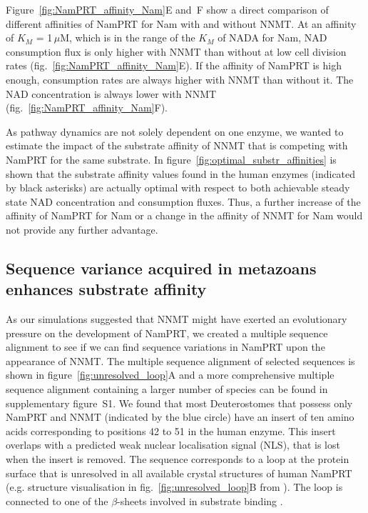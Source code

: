 Figure~\ref{fig:NamPRT_affinity_Nam}E and~F show a direct comparison of different affinities of NamPRT for Nam with and without NNMT. At an affinity of $K_{M}$ = 1\,$\mu$M, which is in the range of the $K_{M}$ of NADA for Nam, NAD consumption flux is only higher with NNMT than without at low cell division rates (fig.~\ref{fig:NamPRT_affinity_Nam}E). If the affinity of NamPRT is high enough, consumption rates are always higher with NNMT than without it. The NAD concentration is always lower with NNMT (fig.~\ref{fig:NamPRT_affinity_Nam}F).

As pathway dynamics are not solely dependent on one enzyme, we wanted to estimate the impact of the substrate affinity of NNMT that is competing with NamPRT for the same substrate. In figure~\ref{fig:optimal_substr_affinities} is shown that the substrate affinity values found in the human enzymes (indicated by black asterisks) are actually optimal with respect to both achievable steady state NAD concentration and consumption fluxes. Thus, a further increase of the affinity of NamPRT for Nam or a change in the affinity of NNMT for Nam would not provide any further  advantage.


\subsection{Sequence variance acquired in metazoans enhances substrate affinity}

As our simulations suggested that NNMT might have exerted an evolutionary pressure on the development of NamPRT, we created a multiple sequence alignment to see if we can find sequence variations in NamPRT upon the appearance of NNMT. The multiple sequence alignment of selected sequences is shown in figure~\ref{fig:unresolved_loop}A and a more comprehensive multiple sequence alignment containing a larger number of species can be found in supplementary figure~S1. We found that most Deuterostomes that possess only NamPRT and NNMT (indicated by the blue circle) have an insert of ten amino acids corresponding to positions 42 to 51 in the human enzyme. This insert overlaps with a predicted weak nuclear localisation signal (NLS), that is lost when the insert is removed. The sequence corresponds to a loop at the protein surface that is unresolved in all available crystal structures of human NamPRT (e.g. structure visualisation in fig.~\ref{fig:unresolved_loop}B from \cite{Wang2006}). The loop is connected to one of the $\beta$-sheets involved in substrate binding \cite{PMID:19666527}.

